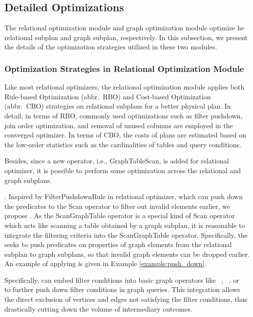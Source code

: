 \subsection{Detailed Optimizations}
\label{sec:framework:detailed-optimizations}

The relational optimization module and graph optimization module optimize he relational subplan and graph subplan, respectively.
In this subsection, we present the details of the optimization strategies utilized in these two modules. 

\subsubsection{Optimization Strategies in Relational Optimization Module}

Like most relational optimizers, the relational optimization module applies both Rule-based Optimization (abbr.~RBO) and Cost-based Optimization (abbr.~CBO) strategies on relational subplans for a better physical plan.
In detail, in terms of RBO, commonly used optimizations such as filter pushdown, join order optimization, and removal of unused columns are employed in the converged optimizer.
In terms of CBO, the costs of plans are estimated based on the low-order statistics such as the cardinalities of tables and query conditions.

Besides, since a new operator, i.e., GraphTableScan, is added for relational optimizer, it is possible to perform some optimization across the relational and graph subplans.

\filterrule. 
Inspired by FilterPushdownRule in relational optimizer, which can push down the predicates to the Scan operator to filter out invalid elements earlier, we propose \filterrule.
As the ScanGraphTable operator is a special kind of Scan operator which acts like scanning a table obtained by a graph subplan, it is reasonable to integrate the filtering criteria into the ScanGraphTable operator.
Specifically, the \filterrule seeks to push predicates on properties of graph elements from the relational subplan to graph subplans, so that invalid graph elements can be dropped earlier.
An example of applying \filterrule is given in Example \ref{example:push_down}.

Specifically, \filterrule can embed filter conditions into basic graph operators like \scan~, \expandedge~, or \getvertex~ to further push down filter conditions in graph queries. 
This integration allows the direct exclusion of vertices and edges not satisfying the filter conditions, thus drastically cutting down the volume of intermediary outcomes.


